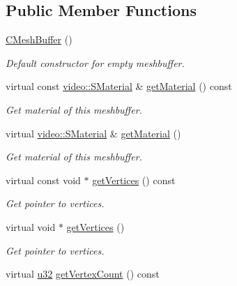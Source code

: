 \subsection*{Public Member Functions}
\begin{DoxyCompactItemize}
\item 
\mbox{\label{classirr_1_1scene_1_1CMeshBuffer_aa2a6fa9d2f7b23fad0d8a86c74a56944}} 
\hyperlink{classirr_1_1scene_1_1CMeshBuffer_aa2a6fa9d2f7b23fad0d8a86c74a56944}{C\+Mesh\+Buffer} ()
\begin{DoxyCompactList}\small\item\em Default constructor for empty meshbuffer. \end{DoxyCompactList}\item 
virtual const \hyperlink{classirr_1_1video_1_1SMaterial}{video\+::\+S\+Material} \& \hyperlink{classirr_1_1scene_1_1CMeshBuffer_a3e971800b0fc1a67134f839309589e43}{get\+Material} () const
\begin{DoxyCompactList}\small\item\em Get material of this meshbuffer. \end{DoxyCompactList}\item 
virtual \hyperlink{classirr_1_1video_1_1SMaterial}{video\+::\+S\+Material} \& \hyperlink{classirr_1_1scene_1_1CMeshBuffer_af69e8356b4525a3fee1ddbf188d81e8a}{get\+Material} ()
\begin{DoxyCompactList}\small\item\em Get material of this meshbuffer. \end{DoxyCompactList}\item 
virtual const void $\ast$ \hyperlink{classirr_1_1scene_1_1CMeshBuffer_ad9463b97ee94bbc26bbb11bf867ea830}{get\+Vertices} () const
\begin{DoxyCompactList}\small\item\em Get pointer to vertices. \end{DoxyCompactList}\item 
virtual void $\ast$ \hyperlink{classirr_1_1scene_1_1CMeshBuffer_a9173c9d0c6f32890ab75dc501aaf5be6}{get\+Vertices} ()
\begin{DoxyCompactList}\small\item\em Get pointer to vertices. \end{DoxyCompactList}\item 
virtual \hyperlink{namespaceirr_a0416a53257075833e7002efd0a18e804}{u32} \hyperlink{classirr_1_1scene_1_1CMeshBuffer_a72ee778498eff327a20c6be179976994}{get\+Vertex\+Count} () const

\end{DoxyCompactItemize}
